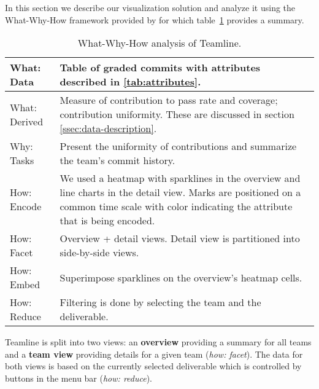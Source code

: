 \documentclass[../manifest.tex]{subfiles}
\begin{document}
In this section we describe our visualization solution and analyze it using the What-Why-How framework provided by \cite{Munzner:2014} for which table~\ref{tab:analysis} provides a summary.

\begin{table}
  \caption{What-Why-How analysis of Teamline.}
  \label{tab:analysis}
  \begin{tabularx}{\columnwidth}{ l | X }
    \hline
    What: Data & Table of graded commits with attributes described in \ref{tab:attributes}. \\
    \hline
    What: Derived & Measure of contribution to pass rate and coverage; contribution uniformity. These are discussed in section \ref{ssec:data-description}. \\
    \hline
    Why: Tasks & Present the uniformity of contributions and summarize the team's commit history. \\
    \hline
    How: Encode & We used a heatmap with sparklines in the overview  and line charts in the detail view. Marks are positioned on a common time scale with color indicating the attribute that is being encoded.\\
    \hline
    How: Facet & Overview + detail views. Detail view is partitioned into side-by-side views. \\
    \hline
    How: Embed & Superimpose sparklines on the overview's heatmap cells. \\
    \hline
    How: Reduce & Filtering is done by selecting the team and the deliverable. \\
    \hline
  \end{tabularx}
\end{table}

Teamline is split into two views: an \textbf{overview} providing a summary for all teams and a \textbf{team view} providing details for a given team (\textit{how: facet}). The data for both views is based on the currently selected deliverable which is controlled by buttons in the menu bar (\textit{how: reduce}).
\end{document}
